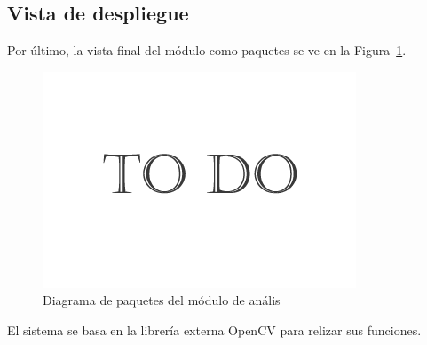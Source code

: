 \subsection{Vista de despliegue}
		
Por último, la vista final del módulo como paquetes se ve en la Figura~\ref{fig:diagramapaquetesPHIC}.\\

		\begin{figure}[htbp]
		\centering
		\includegraphics[scale=0.47]{graphics/todo.png}
		\caption{Diagrama de paquetes del módulo de anális}
		\label{fig:diagramapaquetesPHIC}
		\end{figure}
		
El sistema se basa en la librería externa OpenCV para relizar sus funciones.